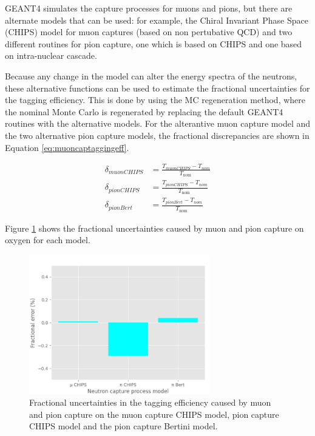GEANT4 simulates the capture processes for muons and pions, but there are alternate models that can be used: for example, the Chiral Invariant Phase Space (CHIPS) model for muon captures (based on non pertubative QCD) and two different routines for pion capture, one which is based on CHIPS and one based on intra-nuclear cascade.

Because any change in the model can alter the energy spectra of the neutrons, these alternative functions can be used to estimate the fractional uncertainties for the tagging efficiency. This is done by using the MC regeneration method, where the nominal Monte Carlo is regenerated by replacing the default GEANT4 routines with the alternative models. For the alterantive muon capture model and the two alternative pion capture models, the fractional discrepancies are shown in Equation \ref{eq:muoncaptaggingeff}.

\begin{equation}
    \begin{aligned}
        \delta_{muon C H I P S} &=\frac{T_{muon C H I P S}-T_{n o m}}{T_{\text {nom }}} \\
        \delta_{pion C H I P S} &=\frac{T_{pion C H I P S}-T_{n o m}}{T_{\text {nom }}} \\
        \delta_{pion B e r t} &=\frac{T_{pion B e r t}-T_{n o m}}{T_{\text {nom }}}
        \end{aligned}
        \label{eq:muoncaptaggingeff}
\end{equation}

Figure \ref{fig:mupicap_uncertainty} shows the fractional uncertainties caused by muon and pion capture on oxygen for each model.

\begin{figure}[!htb]
\centering
    \includegraphics[width=0.7\textwidth]{Figures/mupicap_uncertainty.png}
\caption{Fractional uncertainties in the tagging efficiency caused by muon and pion capture on the muon capture CHIPS model, pion capture CHIPS model and the pion capture Bertini model.}
\label{fig:mupicap_uncertainty}
\end{figure}

